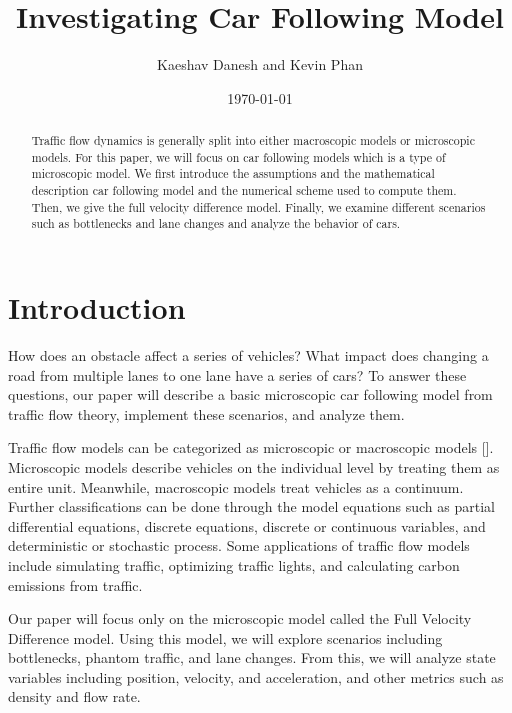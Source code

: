 \documentclass[12pt]{article}
\title{Investigating Car Following Model}
\author{Kaeshav Danesh and Kevin Phan}
\date{\today}
\begin{document}
    \maketitle

    \begin{abstract}
        Traffic flow dynamics is generally split into either macroscopic models or microscopic models. For this paper, we will focus on car following models which is a type of microscopic model. We first introduce the assumptions and the mathematical description car following model and the numerical scheme used to compute them. Then, we give the full velocity difference model. Finally, we examine different scenarios such as bottlenecks and lane changes and analyze the behavior of cars. 
    \end{abstract}

    \newpage

    \tableofcontents

    \newpage

    \section{Introduction}
    How does an obstacle affect a series of vehicles? What impact does changing a road from multiple lanes to one lane have a series of cars? To answer these questions, our paper will describe a basic microscopic car following model from traffic flow theory, implement these scenarios, and analyze them. 

    Traffic flow models can be categorized as microscopic or macroscopic models [\cite{hisTraffic}]. Microscopic models describe vehicles on the individual level by treating them as entire unit. Meanwhile, macroscopic models treat vehicles as a continuum. Further classifications can be done through the model equations such as partial differential equations, discrete equations, discrete or continuous variables, and deterministic or stochastic process. Some applications of traffic flow models include simulating traffic, optimizing traffic lights, and calculating carbon emissions from traffic. 

    Our paper will focus only on the microscopic model called the Full Velocity Difference model. Using this model, we will explore scenarios including bottlenecks, phantom traffic, and lane changes. From this, we will analyze state variables including position, velocity, and acceleration, and other metrics such as density and flow rate. 
\end{document}
